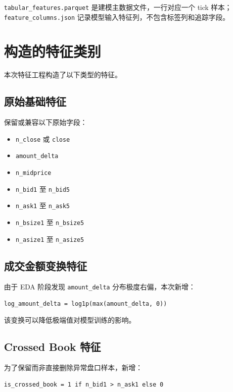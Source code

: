 \documentclass[UTF8,a4paper,12pt]{ctexart}
\begin{document}
\texttt{tabular\_features.parquet} 是建模主数据文件，一行对应一个 tick 样本；\texttt{feature\_columns.json} 记录模型输入特征列，不包含标签列和追踪字段。

\section{构造的特征类别}

本次特征工程构造了以下类型的特征。

\subsection{原始基础特征}

保留或兼容以下原始字段：

\begin{itemize}
  \item \texttt{n\_close} 或 \texttt{close}
  \item \texttt{amount\_delta}
  \item \texttt{n\_midprice}
  \item \texttt{n\_bid1} 至 \texttt{n\_bid5}
  \item \texttt{n\_ask1} 至 \texttt{n\_ask5}
  \item \texttt{n\_bsize1} 至 \texttt{n\_bsize5}
  \item \texttt{n\_asize1} 至 \texttt{n\_asize5}
\end{itemize}

\subsection{成交金额变换特征}

由于 EDA 阶段发现 \texttt{amount\_delta} 分布极度右偏，本次新增：

\begin{center}
\texttt{log\_amount\_delta = log1p(max(amount\_delta, 0))}
\end{center}

该变换可以降低极端值对模型训练的影响。

\subsection{Crossed Book 特征}

为了保留而非直接删除异常盘口样本，新增：

\begin{center}
\texttt{is\_crossed\_book = 1 if n\_bid1 > n\_ask1 else 0}
\end{center}
\end{document}

